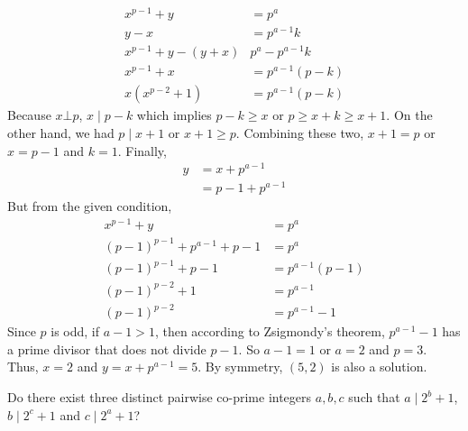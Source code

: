 \documentclass[problems.tex]{subfile}
\begin{document}
\begin{solution}
			\begin{align*}
				x^{p-1}+y & = p^a\\
				y-x & = p^{a-1}k\\
				x^{p-1}+y-(y+x) & p^a-p^{a-1}k\\
				x^{p-1}+x & = p^{a-1}(p-k)\\
				x(x^{p-2}+1) & = p^{a-1}(p-k)
			\end{align*}
		Because $x\bot p$, $x\mid p-k$ which implies $p-k\geq x$ or $p\geq x+k\geq x+1$. On the other hand, we had $p\mid x+1$ or $x+1\geq p$. Combining these two, $x+1=p$ or $x=p-1$ and $k=1$. Finally,
			\begin{align*}
				y & = x+p^{a-1}\\
				  & = p-1+p^{a-1}
			\end{align*}
		But from the given condition,
			\begin{align*}
				x^{p-1}+y & = p^a\\
				(p-1)^{p-1}+p^{a-1}+p-1 & = p^a\\
				(p-1)^{p-1}+p-1 & = p^{a-1}(p-1)\\
				(p-1)^{p-2}+1 & = p^{a-1}\\
				(p-1)^{p-2} & = p^{a-1}-1
			\end{align*}
		Since $p$ is odd, if $a-1>1$, then according to Zsigmondy's theorem, $p^{a-1}-1$ has a prime divisor that does not divide $p-1$. So $a-1=1$ or $a=2$ and $p=3$. Thus, $x=2$ and $y=x+p^{a-1}=5$. By symmetry, $(5,2)$ is also a solution.
	\end{solution}

	\begin{problem}[Russia $2000$]
		Do there exist three distinct pairwise co-prime integers $a,b,c$ such that $a\mid 2^b+1$, $b\mid 2^c+1$ and $c\mid 2^a+1$?
	\end{problem}
\end{document}
